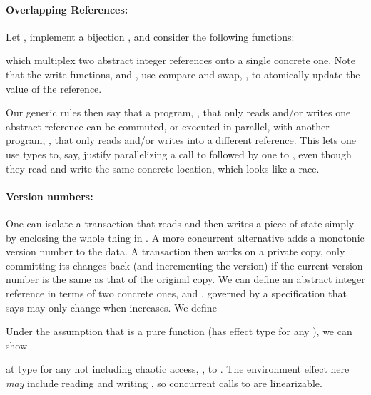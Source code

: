 \documentclass[nocopyrightspace,preprint]{sigplanconf}
\newcommand{\cloc}{\ensuremath{X}\xspace}
\begin{document}
\paragraph{Overlapping References:}
Let , implement a bijection , and consider the following functions:

which multiplex two abstract integer references onto a single concrete one. Note that the write functions,  and , use compare-and-swap,  , to atomically update the value of the reference. 



Our generic rules then say that a program, , that only reads and/or writes one abstract  reference can be commuted, or executed in parallel, with another program, , that only reads and/or writes into a different reference. This lets one use types to, say, justify parallelizing a call to  followed by one to , even though they read and write the same concrete location, which looks like a race.


\paragraph{Version numbers:}
\newcommand{\clocver}{{\cloc}_{\textrm{ver}}}
\newcommand{\clocval}{{\cloc}_{\textrm{val}}}
One can isolate a transaction that reads and then writes a piece of state simply by enclosing the whole thing in . A more concurrent alternative adds a monotonic version number to the data. A transaction then works on a private copy, only committing its changes back (and incrementing the version) if the current version number is the same as that of the original copy. We can define an abstract integer reference  in terms of two concrete ones,  and , governed by a specification that says   may only change when  increases. We define 

Under the assumption that  is a pure function (has effect type  for any ), we can show

at type  for any  not including chaotic access, , to . The environment effect  here \emph{may} include reading and writing , so concurrent calls to  are linearizable. 
\end{document}
